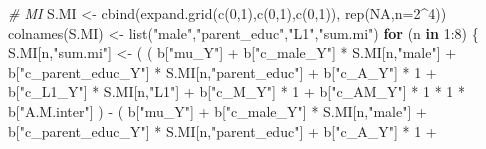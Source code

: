\documentclass[
]{book}
\newenvironment{Shaded}{\begin{snugshade}}{\end{snugshade}}
\newcommand{\AttributeTok}[1]{\textcolor[rgb]{0.77,0.63,0.00}{#1}}
\newcommand{\CommentTok}[1]{\textcolor[rgb]{0.56,0.35,0.01}{\textit{#1}}}
\newcommand{\ConstantTok}[1]{\textcolor[rgb]{0.00,0.00,0.00}{#1}}
\newcommand{\ControlFlowTok}[1]{\textcolor[rgb]{0.13,0.29,0.53}{\textbf{#1}}}
\newcommand{\DecValTok}[1]{\textcolor[rgb]{0.00,0.00,0.81}{#1}}
\newcommand{\FunctionTok}[1]{\textcolor[rgb]{0.00,0.00,0.00}{#1}}
\newcommand{\NormalTok}[1]{#1}
\newcommand{\OtherTok}[1]{\textcolor[rgb]{0.56,0.35,0.01}{#1}}
\newcommand{\SpecialCharTok}[1]{\textcolor[rgb]{0.00,0.00,0.00}{#1}}
\newcommand{\StringTok}[1]{\textcolor[rgb]{0.31,0.60,0.02}{#1}}
\begin{document}
\begin{Shaded}
\begin{Highlighting}[]
  \CommentTok{\# MI }
\NormalTok{  S.MI }\OtherTok{\textless{}{-}} \FunctionTok{cbind}\NormalTok{(}\FunctionTok{expand.grid}\NormalTok{(}\FunctionTok{c}\NormalTok{(}\DecValTok{0}\NormalTok{,}\DecValTok{1}\NormalTok{),}\FunctionTok{c}\NormalTok{(}\DecValTok{0}\NormalTok{,}\DecValTok{1}\NormalTok{),}\FunctionTok{c}\NormalTok{(}\DecValTok{0}\NormalTok{,}\DecValTok{1}\NormalTok{)), }\FunctionTok{rep}\NormalTok{(}\ConstantTok{NA}\NormalTok{,}\AttributeTok{n=}\DecValTok{2}\SpecialCharTok{\^{}}\DecValTok{4}\NormalTok{))}
  \FunctionTok{colnames}\NormalTok{(S.MI) }\OtherTok{\textless{}{-}} \FunctionTok{list}\NormalTok{(}\StringTok{"male"}\NormalTok{,}\StringTok{"parent\_educ"}\NormalTok{,}\StringTok{"L1"}\NormalTok{,}\StringTok{"sum.mi"}\NormalTok{)}
  \ControlFlowTok{for}\NormalTok{ (n }\ControlFlowTok{in} \DecValTok{1}\SpecialCharTok{:}\DecValTok{8}\NormalTok{) \{}
\NormalTok{    S.MI[n,}\StringTok{"sum.mi"}\NormalTok{] }\OtherTok{\textless{}{-}}\NormalTok{ ( ( b[}\StringTok{"mu\_Y"}\NormalTok{] }\SpecialCharTok{+} 
\NormalTok{                              b[}\StringTok{"c\_male\_Y"}\NormalTok{] }\SpecialCharTok{*}\NormalTok{ S.MI[n,}\StringTok{"male"}\NormalTok{] }\SpecialCharTok{+} 
\NormalTok{                              b[}\StringTok{"c\_parent\_educ\_Y"}\NormalTok{] }\SpecialCharTok{*}\NormalTok{ S.MI[n,}\StringTok{"parent\_educ"}\NormalTok{] }\SpecialCharTok{+} 
\NormalTok{                              b[}\StringTok{"c\_A\_Y"}\NormalTok{] }\SpecialCharTok{*} \DecValTok{1} \SpecialCharTok{+} 
\NormalTok{                              b[}\StringTok{"c\_L1\_Y"}\NormalTok{] }\SpecialCharTok{*}\NormalTok{ S.MI[n,}\StringTok{"L1"}\NormalTok{] }\SpecialCharTok{+}
\NormalTok{                              b[}\StringTok{"c\_M\_Y"}\NormalTok{] }\SpecialCharTok{*} \DecValTok{1} \SpecialCharTok{+}
\NormalTok{                              b[}\StringTok{"c\_AM\_Y"}\NormalTok{] }\SpecialCharTok{*} \DecValTok{1} \SpecialCharTok{*} \DecValTok{1} \SpecialCharTok{*}\NormalTok{ b[}\StringTok{"A.M.inter"}\NormalTok{] ) }\SpecialCharTok{{-}} 
\NormalTok{                            ( b[}\StringTok{"mu\_Y"}\NormalTok{] }\SpecialCharTok{+} 
\NormalTok{                                b[}\StringTok{"c\_male\_Y"}\NormalTok{] }\SpecialCharTok{*}\NormalTok{ S.MI[n,}\StringTok{"male"}\NormalTok{] }\SpecialCharTok{+} 
\NormalTok{                                b[}\StringTok{"c\_parent\_educ\_Y"}\NormalTok{] }\SpecialCharTok{*}\NormalTok{ S.MI[n,}\StringTok{"parent\_educ"}\NormalTok{] }\SpecialCharTok{+} 
\NormalTok{                                b[}\StringTok{"c\_A\_Y"}\NormalTok{] }\SpecialCharTok{*} \DecValTok{1} \SpecialCharTok{+} 

\end{Highlighting}
\end{Shaded}
\end{document}
